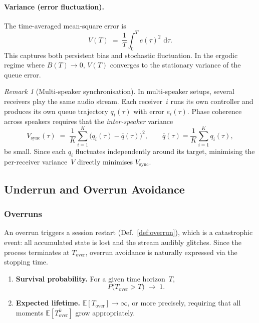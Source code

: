 \documentclass[11pt, a4paper]{article}
\theoremstyle{definition}
\theoremstyle{plain}
\theoremstyle{remark}
\newtheorem{remark}{Remark}[section]
\newcommand{\E}{\mathbb{E}}
\newcommand{\dd}{\,\mathrm{d}}                   %
\begin{document}
\paragraph{Variance (error fluctuation).}
The time-averaged mean-square error is
\begin{equation}\label{eq:mse}
  V(T) \;=\; \frac{1}{T}\int_0^{T} e(\tau)^2\,\dd\tau.
\end{equation}
This captures both persistent bias and stochastic fluctuation.
In the ergodic regime where $B(T) \to 0$,
$V(T)$ converges to the stationary variance of the queue error.

\begin{remark}[Multi-speaker synchronisation]\label{rem:multi-speaker}
  In multi-speaker setups, several receivers play the same audio
  stream.  Each receiver~$i$ runs its own controller and produces
  its own queue trajectory $q_i(\tau)$ with error $e_i(\tau)$.
  Phase coherence across speakers requires that the
  \emph{inter-speaker} variance
  \begin{equation}\label{eq:inter-speaker}
    V_{\text{sync}}(\tau)
      \;=\; \frac{1}{K}\sum_{i=1}^{K}
        \bigl(q_i(\tau) - \bar{q}(\tau)\bigr)^2,
    \qquad
    \bar{q}(\tau) = \frac{1}{K}\sum_{i=1}^{K} q_i(\tau),
  \end{equation}
  be small.  Since each $q_i$ fluctuates independently around its
  target, minimising the per-receiver variance~$V$ directly
  minimises $V_{\text{sync}}$.
\end{remark}

\subsection{Underrun and Overrun Avoidance}\label{sec:avoid-obj}

\subsubsection{Overruns}

An overrun triggers a session restart (Def.~\ref{def:overrun}),
which is a catastrophic event: all accumulated state is lost and
the stream audibly glitches.  Since the process terminates at
$T_{\text{over}}$, overrun avoidance is naturally expressed via the
stopping time.

\begin{enumerate}[label=(O\arabic*)]
  \item \textbf{Survival probability.}\;
    For a given time horizon~$T$,
    \begin{equation}\label{eq:overrun-survival}
      P\bigl(T_{\text{over}} > T\bigr) \;\to\; 1.
    \end{equation}
  \item \textbf{Expected lifetime.}\;
    $\E[T_{\text{over}}] \to \infty$, or more precisely, requiring
    that all moments $\E[T_{\text{over}}^k]$ grow appropriately.
\end{enumerate}
\end{document}
